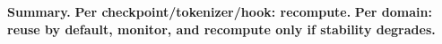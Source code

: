 \begin{itemize}[leftmargin=1.5em]
\begin{description}
\vspace{4pt}
\textbf{Summary.} \textbf{Per checkpoint/tokenizer/hook: recompute.} \textbf{Per domain: reuse by default, monitor, and recompute only if stability degrades.}
\end{description}







\end{itemize}

